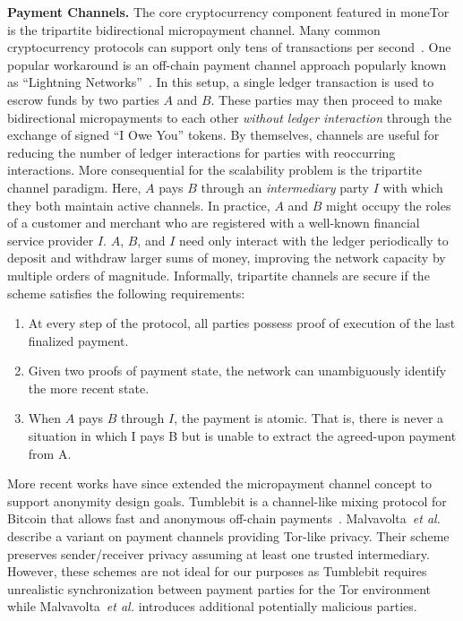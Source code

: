 \medskip \noindent\textbf{Payment Channels.}
The core cryptocurrency component featured in moneTor is the tripartite bidirectional micropayment channel.
Many common cryptocurrency protocols can support only tens of transactions per second~\cite{team2018blockchain}.
One popular workaround is an off-chain payment channel approach popularly known as ``Lightning Networks''~\cite{poon2016bitcoin}.
In this setup, a single ledger transaction is used to escrow funds by two parties $A$ and $B$.
These parties may then proceed to make bidirectional micropayments to each other \emph{without ledger interaction} through the exchange of signed ``I Owe You'' tokens.
By themselves, channels are useful for reducing the number of ledger interactions for parties with reoccurring interactions.
More consequential for the scalability problem is the tripartite channel paradigm.
Here, $A$ pays $B$ through an \emph{intermediary} party $I$ with which they both maintain active channels.
In practice, $A$ and $B$ might occupy the roles of a customer and merchant who are registered with a well-known financial service provider $I$.
$A$, $B$, and $I$ need only interact with the ledger periodically to deposit and withdraw larger sums of money, improving the network capacity by multiple orders of magnitude.
Informally, tripartite channels are secure if the scheme satisfies the following requirements:

\begin{enumerate}
\item At every step of the protocol, all parties possess proof of execution of the last finalized payment.
\item Given two proofs of payment state, the network can unambiguously identify the more recent state.
\item When $A$ pays $B$ through $I$, the payment is atomic.
      That is, there is never a situation in which I pays B but is unable to extract the agreed-upon payment from A.
\end{enumerate}

More recent works have since extended the micropayment channel concept to support anonymity design goals.
Tumblebit is a channel-like mixing protocol for Bitcoin that allows fast and anonymous off-chain payments~\cite{heilman2017tumblebit}.
Malvavolta~\textit{et al.}~\cite{malavolta2017concurrency} describe a variant on payment channels providing Tor-like privacy.
Their scheme preserves sender/receiver privacy assuming at least one trusted intermediary.
However, these schemes are not ideal for our purposes as Tumblebit requires unrealistic synchronization between payment parties for the Tor environment while Malvavolta~\textit{et al.}
introduces additional potentially malicious parties.

